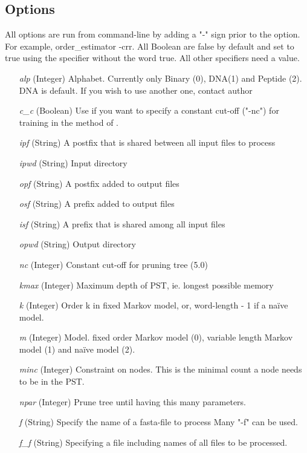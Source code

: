 \documentclass[]{article}
\begin{document}
\subsection{Options}
All options are run from command-line by adding a "-" sign prior to the
option. For example, order\_estimator -crr. All Boolean are false by
default and set to true using the specifier without the word true. All
other specifiers need a value.
\begin{itemize}
\item[\textit{alp}] (Integer) Alphabet. Currently only Binary (0), DNA(1)
  and Peptide (2). DNA is default. If you wish to use another one, contact
  author
\item[\textit{c\_c}] (Boolean) Use if you want to specify a constant cut-off
  ("-nc") for training in the method of \cite{BuhWyn1999}.
\item[\textit{ipf}]  (String) A postfix that is shared between all input
                 files to process
\item[\textit{ipwd}]  (String) Input directory
\item[\textit{opf}]   (String) A postfix added to output files
\item[\textit{osf}]   (String) A prefix added to output files
\item[\textit{isf}]   (String) A prefix that is shared among all input files
\item[\textit{opwd}]  (String) Output directory
\item[\textit{nc}] (Integer) Constant cut-off for pruning tree (5.0)
\item[\textit{kmax}] (Integer) Maximum depth of PST, ie. longest possible memory
\item[\textit{k}] (Integer) Order k in fixed Markov model, or, word-length
  - 1 if a na\"ive model.
\item[\textit{m}] (Integer) Model. fixed order Markov model (0), variable
  length Markov model (1) and na\"ive model (2). 
\item[\textit{minc}] (Integer) Constraint on nodes. This is the minimal
  count a node needs to be in the PST.
\item[\textit{npar}] (Integer) Prune tree until having this many parameters.
\item[\textit{f}]  (String) Specify the name of a fasta-file to process
                Many "-f" can be used.
\item[\textit{f\_f}]  (String) Specifying a file including names of
                 all files to be processed.
 

\end{itemize}
\end{document}
